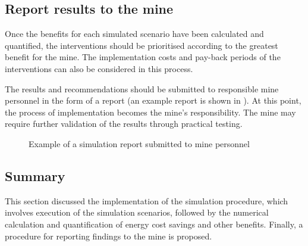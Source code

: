 		\subsection{Report results to the mine}
		Once the benefits for each simulated scenario have been calculated and quantified, the interventions should be prioritised according to the greatest benefit for the mine. The implementation costs and pay-back periods of the interventions can also be considered in this process.
		\par
		The results and recommendations should be submitted to responsible mine personnel in the form of a report (an example report is shown in ). At this point, the process of implementation becomes the mine's responsibility. The mine may require further validation of the results through practical testing.
		\begin{figure}[h]
			\centering
			\caption{Example of a simulation report submitted to mine personnel}
			\label{fig: Report example}
		\end{figure}

	\subsection{Summary}
	This section discussed the implementation of the simulation procedure, which involves execution of the simulation scenarios, followed by the numerical calculation and quantification of energy cost savings and other benefits. Finally, a procedure for reporting findings to the mine is proposed.
